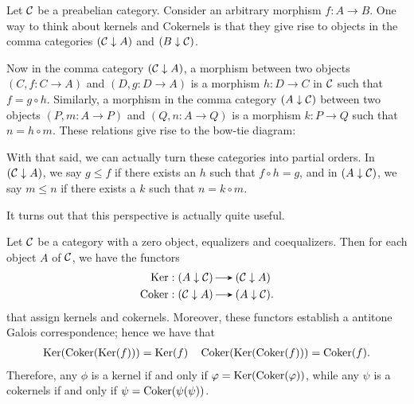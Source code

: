 Let $\mathcal{C}$ be a preabelian category.
Consider an arbitrary morphism $f: A \to B$. 
One way to think about kernels and Cokernels is that they give rise to objects 
in the comma categories $(\mathcal{C} \downarrow A)$ and $(B \downarrow \mathcal{C})$. 
\begin{center}
\end{center}
Now in the comma category $(\mathcal{C} \downarrow A)$, a morphism between two objects 
$(C, f: C \to A)$ and $(D, g: D \to A)$ is a morphism $h: D \to C$ in $\mathcal{C}$ such that 
$f = g \circ h$. Similarly, a morphism in the comma category $(A \downarrow \mathcal{C})$ 
between two objects $(P, m: A \to P)$ and $(Q, n: A \to Q)$ is a morphism $k: P \to Q$ such that 
$n = h \circ m$. These relations give rise to the bow-tie diagram:
\begin{center}
\end{center}
With that said, we can actually turn these categories into partial orders. 
In $(\mathcal{C} \downarrow A)$, we say $g \le f$ if there exists an $h$ such that $f \circ h = g$, 
and in $(A \downarrow \mathcal{C})$, we say $m \le n$ if there exists a $k$ such that 
$n = k \circ m$. 


It turns out that this perspective is actually quite useful. 

\begin{proposition}
    Let $\mathcal{C}$ be a category with a zero object, equalizers and coequalizers. 
    Then for each object $A$ of $\mathcal{C}$, we have the functors 
    \begin{align*}
        \ker&: (A \downarrow \cc) \to (\cc \downarrow A)\\
        \coker&:(\cc \downarrow A) \to (A \downarrow \cc).
    \end{align*}
    that assign kernels and cokernels.
    Moreover, these functors establish a antitone Galois correspondence; hence we have that 
    \begin{align*}
        \operatorname{\mathrm{Ker}}(\operatorname{\mathrm{Coker}}(\operatorname{\mathrm{Ker}}(f))) = \operatorname{\mathrm{Ker}}(f) 
        \quad 
        \operatorname{\mathrm{Coker}}(\operatorname{\mathrm{Ker}}(\operatorname{\mathrm{Coker}}(f))) = \operatorname{\mathrm{Coker}}(f).
    \end{align*}
    Therefore, any $\phi$ is a kernel if and only if $\varphi = \operatorname{\mathrm{Ker}}(\operatorname{\mathrm{Coker}}(\varphi))$, while 
    any $\psi$ is a cokernels if and only if $\psi = \operatorname{\mathrm{Coker}}(\psi(\psi))$. 
\end{proposition}

